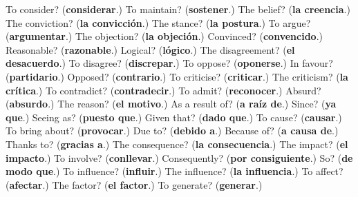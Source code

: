 \begin{tcolorbox}[breakable,colback=teal!4,colframe=teal!35!black,title={Before you move on}]
To consider? (\textbf{considerar}.) To maintain? (\textbf{sostener}.) The belief? (\textbf{la creencia}.) The conviction? (\textbf{la convicción}.) The stance? (\textbf{la postura}.) To argue? (\textbf{argumentar}.) The objection? (\textbf{la objeción}.) Convinced? (\textbf{convencido}.) Reasonable? (\textbf{razonable}.) Logical? (\textbf{lógico}.) The disagreement? (\textbf{el desacuerdo}.) To disagree? (\textbf{discrepar}.) To oppose? (\textbf{oponerse}.) In favour? (\textbf{partidario}.) Opposed? (\textbf{contrario}.) To criticise? (\textbf{criticar}.) The criticism? (\textbf{la crítica}.) To contradict? (\textbf{contradecir}.) To admit? (\textbf{reconocer}.) Absurd? (\textbf{absurdo}.) The reason? (\textbf{el motivo}.) As a result of? (\textbf{a raíz de}.) Since? (\textbf{ya que}.) Seeing as? (\textbf{puesto que}.) Given that? (\textbf{dado que}.) To cause? (\textbf{causar}.) To bring about? (\textbf{provocar}.) Due to? (\textbf{debido a}.) Because of? (\textbf{a causa de}.) Thanks to? (\textbf{gracias a}.) The consequence? (\textbf{la consecuencia}.) The impact? (\textbf{el impacto}.) To involve? (\textbf{conllevar}.) Consequently? (\textbf{por consiguiente}.) So? (\textbf{de modo que}.) To influence? (\textbf{influir}.) The influence? (\textbf{la influencia}.) To affect? (\textbf{afectar}.) The factor? (\textbf{el factor}.) To generate? (\textbf{generar}.)
\end{tcolorbox}
